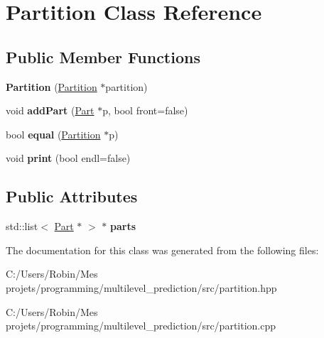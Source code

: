 \hypertarget{class_partition}{}\section{Partition Class Reference}
\label{class_partition}
\subsection*{Public Member Functions}
\begin{DoxyCompactItemize}
\item 
\hypertarget{class_partition_acb291b3b0ccf48005e141be32fdd7efd}{}{\bfseries Partition} (\hyperlink{class_partition}{Partition} $\ast$partition)\label{class_partition_acb291b3b0ccf48005e141be32fdd7efd}

\item 
\hypertarget{class_partition_a63f82a3a75dc0c3d0d27766b2459c9fe}{}void {\bfseries add\+Part} (\hyperlink{class_part}{Part} $\ast$p, bool front=false)\label{class_partition_a63f82a3a75dc0c3d0d27766b2459c9fe}

\item 
\hypertarget{class_partition_abced08b339e293866a614b2f21414375}{}bool {\bfseries equal} (\hyperlink{class_partition}{Partition} $\ast$p)\label{class_partition_abced08b339e293866a614b2f21414375}

\item 
\hypertarget{class_partition_a3463b34ab90d020ed40635c473301a64}{}void {\bfseries print} (bool endl=false)\label{class_partition_a3463b34ab90d020ed40635c473301a64}

\end{DoxyCompactItemize}
\subsection*{Public Attributes}
\begin{DoxyCompactItemize}
\item 
\hypertarget{class_partition_a887cae6498c54754779d7956b48e8d3e}{}std\+::list$<$ \hyperlink{class_part}{Part} $\ast$ $>$ $\ast$ {\bfseries parts}\label{class_partition_a887cae6498c54754779d7956b48e8d3e}

\end{DoxyCompactItemize}


The documentation for this class was generated from the following files\+:\begin{DoxyCompactItemize}
\item 
C\+:/\+Users/\+Robin/\+Mes projets/programming/multilevel\+\_\+prediction/src/partition.\+hpp\item 
C\+:/\+Users/\+Robin/\+Mes projets/programming/multilevel\+\_\+prediction/src/partition.\+cpp\end{DoxyCompactItemize}
